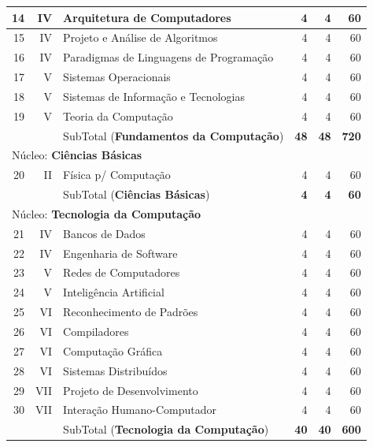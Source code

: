 \documentclass[
	12pt,				%
	openright,			%
  oneside,     %
	a4paper,			%
	chapter=TITLE,		%
	english,			%
	french,				%
	spanish,			%
	brazil				%
	]{abntex2}
\begin{document}
\begin{apendicesenv}
\begin{longtable}{r|r|l|r|r|r}
    14    & IV    & Arquitetura de Computadores & 4     & 4     & 60 \\ \hline
    15    & IV    & Projeto e Análise de Algoritmos & 4     & 4     & 60 \\ \hline
    16    & IV    & Paradigmas de Linguagens de Programação & 4     & 4     & 60 \\ \hline
    17    & V     & Sistemas Operacionais & 4     & 4     & 60 \\ \hline
    18    & V     & Sistemas de Informação e Tecnologias & 4     & 4     & 60 \\ \hline
    19    & V     & Teoria da Computação & 4     & 4     & 60 \\ \hline
          &       & SubTotal (\textbf{Fundamentos da Computação}) & \textbf{48}    & \textbf{48}    & \textbf{720} \\ \hline
\multicolumn{6}{l}{Núcleo: \textbf{Ciências Básicas}} \\ \hline
    20    & II    & Física p/ Computação & 4     & 4     & 60 \\ \hline
          &       & SubTotal (\textbf{Ciências Básicas}) & \textbf{4}     & \textbf{4}     & \textbf{60} \\      \hline
\multicolumn{6}{l}{Núcleo: \textbf{Tecnologia da Computação}} \\         \hline 
    21    & IV    & Bancos de Dados & 4     & 4     & 60 \\     \hline
    22    & IV    & Engenharia de Software & 4     & 4     & 60 \\     \hline
    23    & V     & Redes de Computadores & 4     & 4     & 60 \\     \hline
    24    & V     & Inteligência Artificial & 4     & 4     & 60 \\ \hline 
    25    & VI    & Reconhecimento de Padrões & 4     & 4     & 60 \\     \hline
    26    & VI    & Compiladores & 4     & 4     & 60 \\     \hline
    27    & VI    & Computação Gráfica & 4     & 4     & 60 \\     \hline
    28    & VI    & Sistemas Distribuídos & 4     & 4     & 60 \\     \hline
    29    & VII   & Projeto de Desenvolvimento & 4     & 4     & 60 \\     \hline
    30    & VII   & Interação Humano-Computador & 4     & 4     & 60 \\    \hline
          &       & SubTotal (\textbf{Tecnologia da Computação}) & \textbf{40}    & \textbf{40}    & \textbf{600} \\          \hline

\end{longtable}
\end{apendicesenv}
\end{document}
